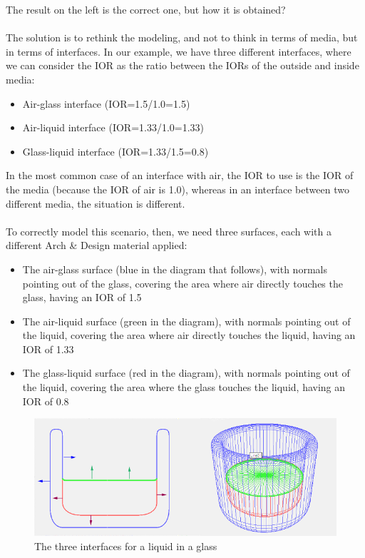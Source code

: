 \documentclass[10pt,a4paper]{article}
\begin{document}
The result on the left is the correct one, but how it is obtained?
\\
\\
The solution is to rethink the modeling, and not to think in terms of media, but in terms of interfaces. In our example, we have three different interfaces, where we can consider the IOR as the ratio between the IORs of the outside and inside media:

\begin{itemize}
	\item Air-glass interface (IOR=1.5/1.0=1.5)
	\item Air-liquid interface (IOR=1.33/1.0=1.33)
	\item Glass-liquid interface (IOR=1.33/1.5=0.8)
\end{itemize}

In the most common case of an interface with air, the IOR to use is the IOR of the media (because the IOR of air is 1.0), whereas in an interface between two different media, the situation is different.
\\
\\
To correctly model this scenario, then, we need three surfaces, each with a different Arch \& Design material applied:

\begin{itemize}
	\item The air-glass surface (blue in the diagram that follows), with normals pointing out of the glass, covering the area where air directly touches the glass, having an IOR of 1.5
	\item The air-liquid surface (green in the diagram), with normals pointing out of the liquid, covering the area where air directly touches the liquid, having an IOR of 1.33
	\item The glass-liquid surface (red in the diagram), with normals pointing out of the liquid, covering the area where the glass touches the liquid, having an IOR of 0.8
\end{itemize}

\begin{figure}[tbh]
	\centering
	\includegraphics[width=0.5\linewidth]{"figure/The three interfaces for a liquid in a glass"}
	\caption{The three interfaces for a liquid in a glass}
	\label{fig:the-three-interfaces-for-a-liquid-in-a-glass}
\end{figure}
\end{document}
